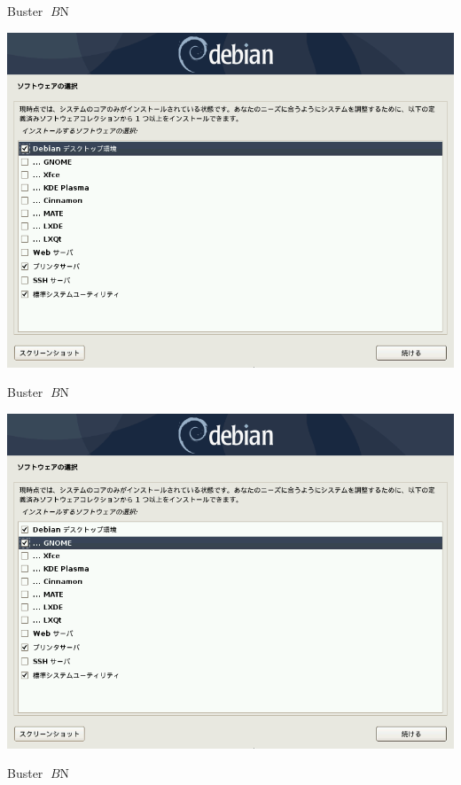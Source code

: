 \documentclass[mingoth,a4paper]{jsarticle}
\begin{document}
{{{{{{{{{{{{{{{{Buster $B$N%

\begin{center}
\includegraphics[keepaspectratio,width=1\hsize]{image201907/buster_tasksel_0.png}
\end{center}



Buster $B$N%

\begin{center}
\includegraphics[keepaspectratio,width=1\hsize]{image201907/buster_tasksel_1.png}
\end{center}



Buster $B$N%

}}}}}}}}}}}}}}}}
\end{document}
